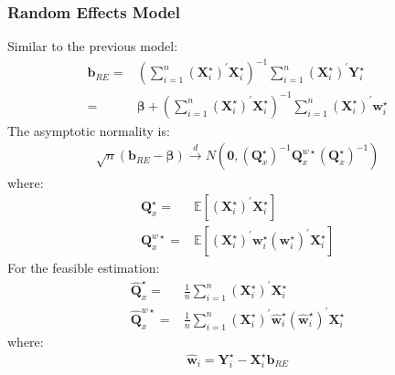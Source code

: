 \documentclass{article}
\begin{document}
\subsubsection{Random Effects Model}
Similar to the previous model:
	\begin{align*}
		\boldsymbol{b}_{RE} = &(\sum^n_{i=1} (\boldsymbol{X}^\star_i)^\prime \boldsymbol{X}^\star_i)^{-1} \sum^n_{i=1} (\boldsymbol{X}^\star_i)^\prime \boldsymbol{Y}^\star_i\\ = &
		\boldsymbol{\beta} + (\sum^n_{i=1} (\boldsymbol{X}^\star_i)^\prime \boldsymbol{X}^\star_i)^{-1} \sum^n_{i=1} (\boldsymbol{X}^\star_i)^\prime \boldsymbol{w}^\star_i
	\end{align*}
The asymptotic normality is:
	\begin{align*}
		\sqrt{n}(\boldsymbol{b}_{RE} - \boldsymbol{\beta}) \xrightarrow{d} N(\boldsymbol{0}, (\boldsymbol{Q}^{\star}_x)^{-1} \boldsymbol{Q}^{w\star}_x (\boldsymbol{Q}^{\star}_x)^{-1})
	\end{align*}
where:
	\begin{align*}
		\boldsymbol{Q}^\star_x = &\mathbb{E} [(\boldsymbol{X}^\star_i)^\prime \boldsymbol{X}^\star_i]\\
		\boldsymbol{Q}^{w\star}_x = &\mathbb{E} [(\boldsymbol{X}^\star_i)^\prime \boldsymbol{w}^\star_i (\boldsymbol{w}^\star_i)^\prime \boldsymbol{X}^\star_i]
	\end{align*}
For the feasible estimation:
	\begin{align*}
		\hat{\boldsymbol{Q}}^\star_x =& \frac{1}{n} \sum^n_{i=1} (\boldsymbol{X}^\star_i)^\prime \boldsymbol{X}^\star_i\\
		\hat{\boldsymbol{Q}}^{w\star}_x =& \frac{1}{n} \sum^n_{i=1} (\boldsymbol{X}^\star_i)^\prime \hat{\boldsymbol{w}}^\star_i (\hat{\boldsymbol{w}}^\star_i)^\prime \boldsymbol{X}^\star_i 
	\end{align*}
where:
	\begin{align*}
		\hat{\boldsymbol{w}}_i = \boldsymbol{Y}^\star_i - \boldsymbol{X}^\star_i \boldsymbol{b}_{RE}
	\end{align*}
\end{document}
